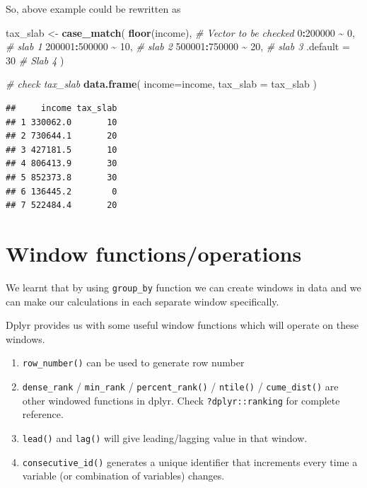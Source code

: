 \documentclass[
]{book}
\newenvironment{Shaded}{\begin{snugshade}}{\end{snugshade}}
\newcommand{\AttributeTok}[1]{\textcolor[rgb]{0.13,0.29,0.53}{#1}}
\newcommand{\CommentTok}[1]{\textcolor[rgb]{0.56,0.35,0.01}{\textit{#1}}}
\newcommand{\DecValTok}[1]{\textcolor[rgb]{0.00,0.00,0.81}{#1}}
\newcommand{\FunctionTok}[1]{\textcolor[rgb]{0.13,0.29,0.53}{\textbf{#1}}}
\newcommand{\NormalTok}[1]{#1}
\newcommand{\OtherTok}[1]{\textcolor[rgb]{0.56,0.35,0.01}{#1}}
\newcommand{\SpecialCharTok}[1]{\textcolor[rgb]{0.81,0.36,0.00}{\textbf{#1}}}
\providecommand{\tightlist}{%
  \setlength{\itemsep}{0pt}\setlength{\parskip}{0pt}}
\begin{document}
So, above example could be rewritten as

\begin{Shaded}
\begin{Highlighting}[]
\NormalTok{tax\_slab }\OtherTok{\textless{}{-}} \FunctionTok{case\_match}\NormalTok{(}
  \FunctionTok{floor}\NormalTok{(income), }\CommentTok{\# Vector to be checked}
  \DecValTok{0}\SpecialCharTok{:}\DecValTok{200000} \SpecialCharTok{\textasciitilde{}} \DecValTok{0}\NormalTok{, }\CommentTok{\# slab 1}
  \DecValTok{200001}\SpecialCharTok{:}\DecValTok{500000} \SpecialCharTok{\textasciitilde{}} \DecValTok{10}\NormalTok{, }\CommentTok{\# slab 2}
  \DecValTok{500001}\SpecialCharTok{:}\DecValTok{750000} \SpecialCharTok{\textasciitilde{}} \DecValTok{20}\NormalTok{, }\CommentTok{\# slab 3}
  \AttributeTok{.default =} \DecValTok{30} \CommentTok{\# Slab 4}
\NormalTok{)}

\CommentTok{\# check tax\_slab}
\FunctionTok{data.frame}\NormalTok{(}
  \AttributeTok{income=}\NormalTok{income,}
  \AttributeTok{tax\_slab =}\NormalTok{ tax\_slab}
\NormalTok{)}
\end{Highlighting}
\end{Shaded}

\begin{verbatim}
##     income tax_slab
## 1 330062.0       10
## 2 730644.1       20
## 3 427181.5       10
## 4 806413.9       30
## 5 852373.8       30
## 6 136445.2        0
## 7 522484.4       20
\end{verbatim}

\hypertarget{window-functionsoperations}{%
\section{Window functions/operations}\label{window-functionsoperations}}

We learnt that by using \texttt{group\_by} function we can create windows in data and we can make our calculations in each separate window specifically.

Dplyr provides us with some useful window functions which will operate on these windows.

\begin{enumerate}
\def\labelenumi{\arabic{enumi}.}
\tightlist
\item
  \texttt{row\_number()} can be used to generate row number
\item
  \texttt{dense\_rank} / \texttt{min\_rank} / \texttt{percent\_rank()} / \texttt{ntile()} / \texttt{cume\_dist()} are other windowed functions in dplyr. Check \texttt{?dplyr::ranking} for complete reference.
\item
  \texttt{lead()} and \texttt{lag()} will give leading/lagging value in that window.
\item
  \texttt{consecutive\_id()} generates a unique identifier that increments every time a variable (or combination of variables) changes.
\end{enumerate}
\end{document}
